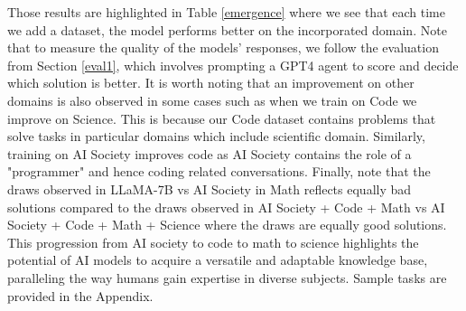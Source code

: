 Those results are highlighted in Table \ref{emergence} where we see that each time we add a dataset, the model performs better on the incorporated domain. Note that to measure the quality of the models' responses, we follow the evaluation from Section \ref{eval1}, which involves prompting a GPT4 agent to score and decide which solution is better. It is worth noting that an improvement on other domains is also observed in some cases such as when we train on Code we improve on Science. This is because our Code dataset contains problems that solve tasks in particular domains which include scientific domain. Similarly, training on AI Society improves code as AI Society contains the role of a "programmer" and hence coding related conversations. Finally, note that the draws observed in LLaMA-7B vs AI Society in Math reflects equally bad solutions compared to the draws observed in AI Society + Code + Math vs AI Society + Code + Math + Science where the draws are equally good solutions. This progression from AI society to code to math to science highlights the potential of AI models to acquire a versatile and adaptable knowledge base, paralleling the way humans gain expertise in diverse subjects. Sample tasks are provided in the Appendix.

